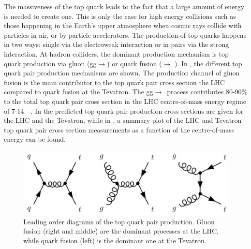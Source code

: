 The massiveness of the top quark leads to the fact that a large amount of energy is needed to create one. This is only the case for high energy collisions such as those happening in the Earth's upper atmosphere when cosmic rays collide with particles in air, or by particle accelerators. The production of top quarks happens in two ways: single via the electroweak interaction or in pairs via the strong interaction. At hadron colliders, the dominant production mechanism is top quark production via gluon (gg$\rightarrow$\ttbar) or quark fusion (\qqbar $\rightarrow$ \ttbar). In , the different top quark pair production mechanisms are shown. The production channel of gluon fusion is the main contributor to the top quark pair cross section the LHC compared to quark fusion at the Tevatron. %
The gg$\rightarrow$\ttbar\ process contributes 80-90\% to the total top quark pair cross section in the LHC centre-of-mass energy regime of 7-14~\TeV~\cite{PDG}. In  the predicted top quark pair production cross sections are given for the LHC and the Tevatron, while in , a summary plot of the LHC and Tevatron top quark pair cross section measurements as a function of the centre-of-mass energy can be found.
\begin{figure}[htbp]
	\centering
	\includegraphics[width=0.7\linewidth]{1_Introduction/Figures/toppair}
	\caption{Leading order diagrams of the top quark pair production. Gluon fusion (right and middle) are the dominant processes at the LHC, while quark fusion (left) is the dominant one at the Tevatron. }
	\label{fig:toppairproduction}
\end{figure}
